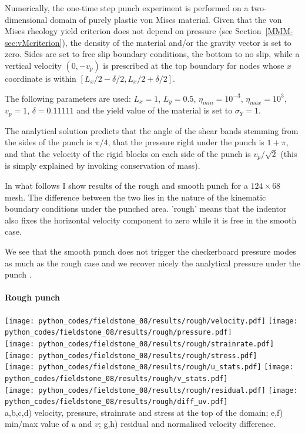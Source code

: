 Numerically, the one-time step punch experiment is performed on a two-dimensional
domain of purely plastic von Mises material. 
Given that the von Mises rheology yield criterion does not depend on pressure
(see Section~\ref{MMM-sec:vMcriterion}), the density of the material and/or the gravity 
vector is set to zero. Sides are set to free slip boundary conditions, the bottom to no slip, 
while a vertical velocity $(0,-v_p)$ is prescribed at the top boundary for nodes 
whose $x$ coordinate is within $[L_x/2-\delta/2,L_x/2+\delta/2]$. 

The following parameters are used: $L_x=1$, $L_y=0.5$, $\eta_{min}=10^{-3}$, 
$\eta_{max}=10^3$, $v_p=1$, $\delta=0.11111$ 
and the yield value of the material is set to $\sigma_Y=1$. 

The analytical solution predicts that the angle of the shear bands stemming from the sides of the punch 
is $\pi/4$, that the pressure right under the punch is $1+\pi$, 
and that the velocity of the rigid blocks on each side of the punch is $v_p/\sqrt{2}$ 
(this is simply explained by invoking conservation of mass).

In what follows I show results of the rough and smooth punch for a $124\times 68$ mesh. The difference between the two
lies in the nature of the kinematic boundary conditions under the punched area. 'rough' means that the indentor 
also fixes the horizontal velocity component to zero while it is free in the smooth case.

We see that the smooth punch does not trigger the checkerboard pressure modes as much as the rough case 
and we recover nicely the analytical pressure under the punch \cite{thfb08,gltf18}.

\newpage
\paragraph{Rough punch} 

\begin{center}
\texttt{[image: python\_codes/fieldstone\_08/results/rough/velocity.pdf]}
\texttt{[image: python\_codes/fieldstone\_08/results/rough/pressure.pdf]}\\
\texttt{[image: python\_codes/fieldstone\_08/results/rough/strainrate.pdf]}
\texttt{[image: python\_codes/fieldstone\_08/results/rough/stress.pdf]}\\
\texttt{[image: python\_codes/fieldstone\_08/results/rough/u\_stats.pdf]}
\texttt{[image: python\_codes/fieldstone\_08/results/rough/v\_stats.pdf]}\\
\texttt{[image: python\_codes/fieldstone\_08/results/rough/residual.pdf]}
\texttt{[image: python\_codes/fieldstone\_08/results/rough/diff\_uv.pdf]}\\
{\captionfont a,b,c,d) velocity, pressure, strainrate and stress at the top of the domain; 
e,f) min/max value of $u$ and $v$;
g,h) residual and normalised velocity difference.}
\end{center}

